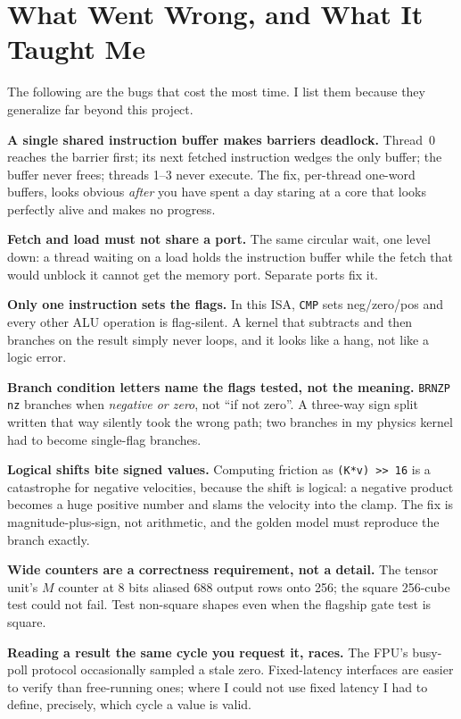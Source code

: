 \documentclass[conference]{IEEEtran}
\begin{document}
\section{What Went Wrong, and What It Taught Me}
\label{sec:lessons}

The following are the bugs that cost the most time. I list them because they
generalize far beyond this project.

\textbf{A single shared instruction buffer makes barriers deadlock.} Thread~0
reaches the barrier first; its next fetched instruction wedges the only buffer;
the buffer never frees; threads 1--3 never execute. The fix, per-thread
one-word buffers, looks obvious \emph{after} you have spent a day staring at a
core that looks perfectly alive and makes no progress.

\textbf{Fetch and load must not share a port.} The same circular wait, one level
down: a thread waiting on a load holds the instruction buffer while the fetch
that would unblock it cannot get the memory port. Separate ports fix it.

\textbf{Only one instruction sets the flags.} In this ISA, \texttt{CMP} sets
neg/zero/pos and every other ALU operation is flag-silent. A kernel that
subtracts and then branches on the result simply never loops, and it looks
like a hang, not like a logic error.

\textbf{Branch condition letters name the flags tested, not the meaning.}
\texttt{BRNZP nz} branches when \emph{negative or zero}, not ``if not zero''. A
three-way sign split written that way silently took the wrong path; two
branches in my physics kernel had to become single-flag branches.

\textbf{Logical shifts bite signed values.} Computing friction as
\texttt{(K*v) >> 16} is a catastrophe for negative velocities, because the shift
is logical: a negative product becomes a huge positive number and slams the
velocity into the clamp. The fix is magnitude-plus-sign, not arithmetic, and the
golden model must reproduce the branch exactly.

\textbf{Wide counters are a correctness requirement, not a detail.} The tensor
unit's $M$ counter at 8 bits aliased 688 output rows onto 256; the square
256-cube test could not fail. Test non-square shapes even when the flagship gate
test is square.

\textbf{Reading a result the same cycle you request it, races.} The FPU's
busy-poll protocol occasionally sampled a stale zero. Fixed-latency interfaces
are easier to verify than free-running ones; where I could not use fixed
latency I had to define, precisely, which cycle a value is valid.
\end{document}
